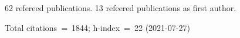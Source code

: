 62 refereed publications. 13 refeered publications as first author.

Total citations~=~1844; h-index~=~22 (2021-07-27)
